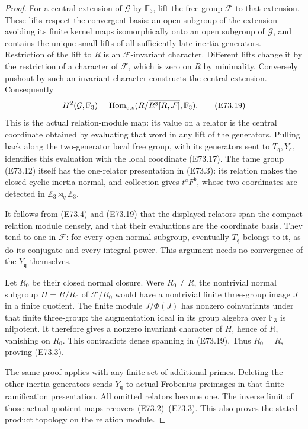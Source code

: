 \begin{proof}
For a central extension of $\mathcal G$ by
$\mathbb F_3$, lift the free group $\mathcal F$
to that extension. These lifts respect the convergent
basis: an open subgroup of the extension avoiding its
finite kernel maps isomorphically onto an open subgroup
of $\mathcal G$, and contains the unique small lifts
of all sufficiently late inertia generators.
Restriction of the lift to $R$
is an $\mathcal F$-invariant character. Different
lifts change it by the restriction of a character
of $\mathcal F$, which is zero on $R$ by minimality.
Conversely pushout by such an invariant character
constructs the central extension. Consequently
\[
 H^2(\mathcal G,\mathbb F_3)
      =\operatorname{Hom}_{\rm cts}
          (R/\overline{R^3[R,\mathcal F]},\mathbb F_3).
 \tag{E73.19}
\]
This is the actual relation-module map: its value
on a relator is the central coordinate obtained by
evaluating that word in any lift of the generators.
Pulling back along the two-generator local free
group, with its generators sent to
$T_{\mathfrak q},Y_{\mathfrak q}$, identifies this
evaluation with the local coordinate (E73.17).
The tame group (E73.12) itself has the one-relator
presentation in (E73.3): its relation makes the
closed cyclic inertia normal, and collection
gives $t^aF^b$, whose two coordinates are detected
in $\mathbb Z_3\rtimes_q\mathbb Z_3$.

It follows from (E73.4) and (E73.19) that the
displayed relators span the compact relation
module densely, and that their evaluations are
the coordinate basis. They tend to one in
$\mathcal F$: for every open normal subgroup,
eventually $T_{\mathfrak q}$ belongs to it,
as do its conjugate and every integral power.
This argument needs no convergence of the
$Y_{\mathfrak q}$ themselves.

Let $R_0$ be their closed normal closure. Were
$R_0\ne R$, the nontrivial normal subgroup
$H=R/R_0$ of $\mathcal F/R_0$ would have a
nontrivial finite three-group image $J$ in a
finite quotient. The finite module $J/\Phi(J)$
has nonzero coinvariants under that finite
three-group: the augmentation ideal in its
group algebra over $\mathbb F_3$ is nilpotent.
It therefore gives a nonzero invariant character
of $H$, hence of $R$, vanishing on $R_0$.
This contradicts dense spanning in (E73.19).
Thus $R_0=R$, proving (E73.3).

The same proof applies with any finite set of
additional primes. Deleting the other inertia
generators sends $Y_{\mathfrak q}$ to actual
Frobenius preimages in that finite-ramification
presentation. All omitted relators become one.
The inverse limit of those actual quotient maps
recovers (E73.2)--(E73.3). This also proves the
stated product topology on the relation module.


\end{proof}
